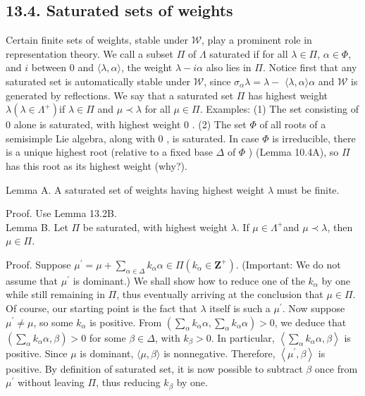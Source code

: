\documentclass[10pt]{article}
\begin{document}
\subsection*{13.4. Saturated sets of weights}
Certain finite sets of weights, stable under $\mathscr{W}$, play a prominent role in representation theory. We call a subset $\Pi$ of $\Lambda$ saturated if for all $\lambda \in \Pi$, $\alpha \in \Phi$, and $i$ between 0 and $\langle\lambda, \alpha\rangle$, the weight $\lambda-i \alpha$ also lies in $\Pi$. Notice first that any saturated set is automatically stable under $\mathscr{W}$, since $\sigma_{\alpha} \lambda=\lambda-$ $\langle\lambda, \alpha\rangle \alpha$ and $\mathscr{W}$ is generated by reflections. We say that a saturated set $\Pi$ has highest weight $\lambda\left(\lambda \in \Lambda^{+}\right)$if $\lambda \in \Pi$ and $\mu \prec \lambda$ for all $\mu \in \Pi$. Examples: (1) The set consisting of 0 alone is saturated, with highest weight 0 . (2) The set $\Phi$ of all roots of a semisimple Lie algebra, along with 0 , is saturated. In case $\Phi$ is irreducible, there is a unique highest root (relative to a fixed base $\Delta$ of $\Phi$ ) (Lemma 10.4A), so $\Pi$ has this root as its highest weight (why?).

Lemma A. A saturated set of weights having highest weight $\lambda$ must be finite.

Proof. Use Lemma 13.2B.\\
Lemma B. Let $\Pi$ be saturated, with highest weight $\lambda$. If $\mu \in \Lambda^{+}$and $\mu \prec \lambda$, then $\mu \in \Pi$.

Proof. Suppose $\mu^{\prime}=\mu+\sum_{\alpha \in \Delta} k_{\alpha} \alpha \in \Pi\left(k_{\alpha} \in \mathbf{Z}^{+}\right)$. (Important: We do not\\
assume that $\mu^{\prime}$ is dominant.) We shall show how to reduce one of the $k_{\alpha}$ by one while still remaining in $\Pi$, thus eventually arriving at the conclusion that $\mu \in \Pi$. Of course, our starting point is the fact that $\lambda$ itself is such a $\mu^{\prime}$. Now suppose $\mu^{\prime} \neq \mu$, so some $k_{\alpha}$ is positive. From $\left(\sum_{\alpha} k_{\alpha} \alpha, \sum_{\alpha} k_{\alpha} \alpha\right)>0$, we deduce that $\left(\sum_{\alpha} k_{\alpha} \alpha, \beta\right)>0$ for some $\beta \in \Delta$, with $k_{\beta}>0$. In particular, $\left\langle\sum_{\alpha} k_{\alpha} \alpha, \beta\right\rangle$ is positive. Since $\mu$ is dominant, $\langle\mu, \beta\rangle$ is nonnegative. Therefore, $\left\langle\mu^{\prime}, \beta\right\rangle$ is positive. By definition of saturated set, it is now possible to subtract $\beta$ once from $\mu^{\prime}$ without leaving $\Pi$, thus reducing $k_{\beta}$ by one.
\end{document}
